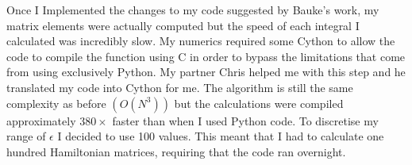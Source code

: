 \documentclass[10pt, a4paper, singlespacing]{report}
\begin{document}
Once I Implemented the changes to my code suggested by Bauke's work, my matrix elements were actually computed but the speed of each integral I calculated was incredibly slow. My numerics required some Cython to allow the code to compile the function using C in order to bypass the limitations that come from using exclusively Python. My partner Chris helped me with this step and he translated my code into Cython for me. The algorithm is still the same complexity as before $(O(N^3))$ but the calculations were compiled approximately $380\times$ faster than when I used Python code. To discretise my range of $\epsilon$ I decided to use 100 values. This meant that I had to calculate one hundred Hamiltonian matrices, requiring that the code ran overnight.
\end{document}
